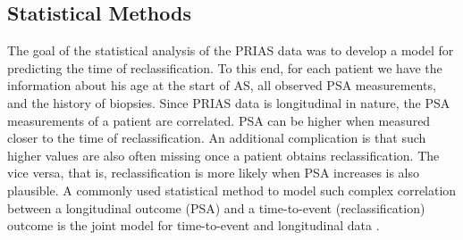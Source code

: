 \subsection{Statistical Methods}
The goal of the statistical analysis of the PRIAS data was to develop a model for predicting the time of reclassification. To this end, for each patient we have the information about his age at the start of AS, all observed PSA measurements, and the history of biopsies. Since PRIAS data is longitudinal in nature, the PSA measurements of a patient are correlated. PSA can be higher when measured closer to the time of reclassification. An additional complication is that such higher values are also often missing once a patient obtains reclassification. The vice versa, that is, reclassification is more likely when PSA increases is also plausible. A commonly used statistical method to model such complex correlation between a longitudinal outcome (PSA) and a time-to-event (reclassification) outcome is the joint model for time-to-event and longitudinal data \citep{rizopoulos2012joint,tomer2019,coley2017prediction}.

